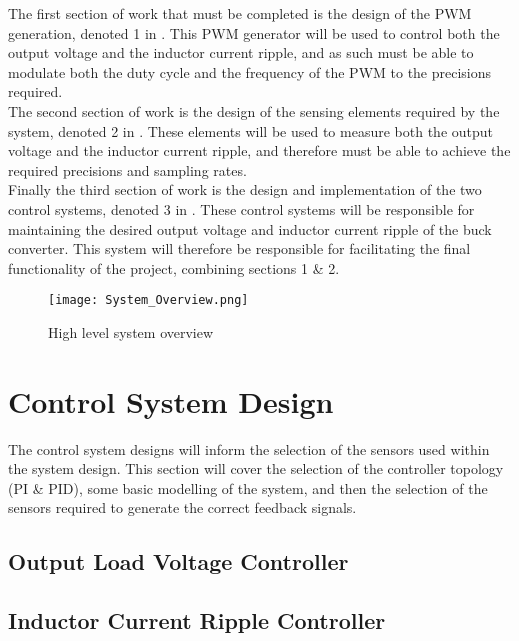 The first section of work that must be completed is the design of the PWM generation, denoted 1 in . This PWM generator will be used to control both the output voltage and the inductor current ripple, and as such must be able to modulate both the duty cycle and the frequency of the PWM to the precisions required. \\

The second section of work is the design of the sensing elements required by the system, denoted 2 in . These elements will be used to measure both the output voltage and the inductor current ripple, and therefore must be able to achieve the required precisions and sampling rates. \\

Finally the third section of work is the design and implementation of the two control systems, denoted 3 in . These control systems will be responsible for maintaining the desired output voltage and inductor current ripple of the buck converter. This system will therefore be responsible for facilitating the final functionality of the project, combining sections 1 \& 2. \\

\begin{figure}[!h]
    \texttt{[image: System\_Overview.png]}
    \caption{High level system overview}
    \label{F:sys_overview}
\end{figure}





\section{Control System Design}

The control system designs will inform the selection of the sensors used within the system design. This section will cover the selection of the controller topology (PI \& PID), some basic modelling of the system, and then the selection of the sensors required to generate the correct feedback signals. 

\subsection{Output Load Voltage Controller}

\subsection{Inductor Current Ripple Controller}



